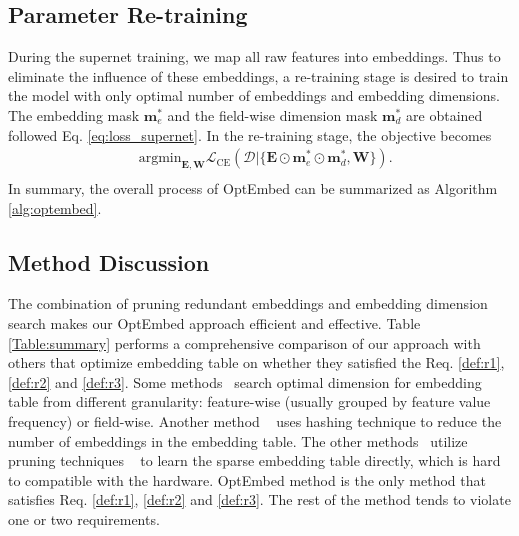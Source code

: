\documentclass[sigconf]{acmart}
\begin{document}
\subsection{Parameter Re-training}
\label{sec:retrain}

During the supernet training, we map all raw features into embeddings. Thus to eliminate the influence of these embeddings, a re-training stage is desired to train the model with only optimal number of embeddings and embedding dimensions. The embedding mask $\mathbf{m}_e^{*}$ and the field-wise dimension mask $\mathbf{m}_d^{*}$ are obtained followed Eq. \ref{eq:loss_supernet}. In the re-training stage, the objective becomes
\begin{equation}
\begin{aligned}
    & \text{argmin}_{\mathbf{E},\mathbf{W}} \mathcal{L}_{\text{CE}}(\mathcal{D} | \{ \mathbf{E} \odot \mathbf{m}_e^* \odot \mathbf{m}_d^*, \mathbf{W}\}). \\
\end{aligned}
\label{eq:retrain}
\end{equation}
In summary, the overall process of OptEmbed can be summarized as Algorithm \ref{alg:optembed}.



\subsection{Method Discussion}
\label{sec:summary}

The combination of pruning redundant embeddings and embedding dimension search makes our OptEmbed approach efficient and effective. Table \ref{Table:summary} performs a comprehensive comparison of our approach with others that optimize embedding table on whether they satisfied the Req. \ref{def:r1}, \ref{def:r2} and \ref{def:r3}. Some methods~\cite{MDE,DNIS,AutoDim,AutoIAS,MGQE} search optimal dimension for embedding table from different granularity: feature-wise (usually grouped by feature value frequency) or field-wise. Another method ~\cite{QR} uses hashing technique to reduce the number of embeddings in the embedding table. The other methods~\cite{UMEC,PEP} utilize pruning techniques ~\cite{DST,LTH} to learn the sparse embedding table directly, which is hard to compatible with the hardware. OptEmbed method is the only method that satisfies Req. \ref{def:r1}, \ref{def:r2} and \ref{def:r3}. The rest of the method tends to violate one or two requirements. 
\end{document}
